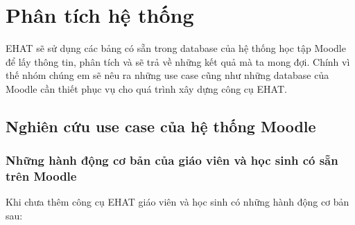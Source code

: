 \setcounter{chapter}{2}
\chapter{Phân tích hệ thống}
EHAT sẽ sử dụng các bảng có sẵn trong database của hệ thống học tập Moodle để lấy thông tin, phân tích và sẽ trả về những kết quả mà ta mong đợi. Chính vì thế nhóm chúng em sẽ nêu ra những use case cũng như những database của Moodle cần thiết phục vụ cho quá trình xây dựng công cụ EHAT.
\section{Nghiên cứu use case của hệ thống Moodle}
\subsection{Những hành động cơ bản của giáo viên và học sinh có sẵn trên Moodle}
Khi chưa thêm công cụ EHAT giáo viên và học sinh có những hành động cơ bản sau: \cite{usecase:1}
